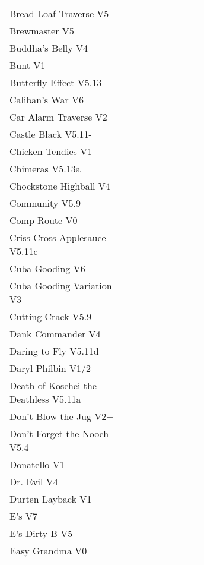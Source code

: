 \begin{flushleft}
\begin{center}
\begin{supertabular}{p{0.65\linewidth}r}
Bread Loaf Traverse V5 & \pageref{rt:Bread Loaf Traverse} \\
Brewmaster V5 & \pageref{rt:Brewmaster} \\
Buddha's Belly V4 & \pageref{rt:Buddha's Belly} \\
Bunt V1 & \pageref{rt:Bunt} \\
Butterfly Effect V5.13- & \pageref{rt:Butterfly Effect} \\
Caliban's War V6 & \pageref{rt:Caliban's War} \\
Car Alarm Traverse V2 & \pageref{rt:Car Alarm Traverse} \\
Castle Black V5.11- & \pageref{rt:Castle Black} \\
Chicken Tendies V1 & \pageref{rt:Chicken Tendies} \\
Chimeras V5.13a & \pageref{rt:Chimeras} \\
Chockstone Highball V4 & \pageref{rt:Chockstone Highball} \\
Community V5.9 & \pageref{rt:Community} \\
Comp Route V0 & \pageref{rt:Comp Route} \\
Criss Cross Applesauce V5.11c & \pageref{rt:Criss Cross Applesauce} \\
Cuba Gooding V6 & \pageref{rt:Cuba Gooding} \\
Cuba Gooding Variation V3 & \pageref{vr:Cuba Gooding Variation} \\
Cutting Crack V5.9 & \pageref{rt:Cutting Crack} \\
Dank Commander V4 & \pageref{rt:Dank Commander} \\
Daring to Fly V5.11d & \pageref{rt:Daring to Fly} \\
Daryl Philbin V1/2 & \pageref{rt:Daryl Philbin} \\
Death of Koschei the Deathless V5.11a & \pageref{rt:Death of Koschei the Deathless} \\
Don't Blow the Jug V2+ & \pageref{rt:Don't Blow the Jug} \\
Don't Forget the Nooch V5.4 & \pageref{rt:Don't Forget the Nooch} \\
Donatello V1 & \pageref{rt:Donatello} \\
Dr. Evil V4 & \pageref{rt:Dr. Evil} \\
Durten Layback V1 & \pageref{rt:Durten Layback} \\
E's V7 & \pageref{rt:E's} \\
E's Dirty B V5 & \pageref{rt:E's Dirty B} \\
Easy Grandma V0 & \pageref{rt:Easy Grandma} \\

\end{supertabular}
\end{center}
\end{flushleft}
